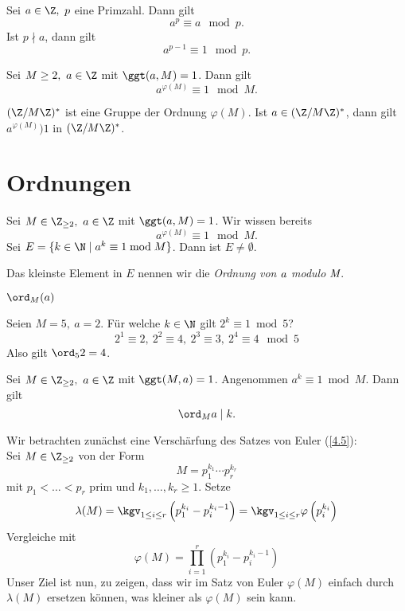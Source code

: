 \begin{thm}\autolabel
	Sei $a \in \Z,\ p $ eine Primzahl. Dann gilt
	\[ a^p \equiv a \mod p. \]
	Ist $p \nmid a$, dann gilt
	\[ a^{p-1} \equiv 1 \mod p. \]
\end{thm}

\begin{thm}[Euler]\autolabel
	Sei $M \geq 2,\ a \in \Z$ mit $\ggt(a,M) = 1$. Dann gilt
	\[ a^{\varphi(M)} \equiv 1 \mod M. \]
\end{thm}

\begin{rem*}
	$(\Z/M\Z)^*$ ist eine Gruppe der Ordnung $\varphi(M)$. Ist $a \in (\Z/M\Z)^*$, dann gilt $a^{\varphi(M)} ) 1$ in $(\Z/M\Z)^*$.
\end{rem*}

\section{Ordnungen}

Sei $M \in \Z_{\geq 2},\ a \in \Z$ mit $\ggt(a,M)=1$. Wir wissen bereits 
\[ a^{\varphi(M)} \equiv 1 \mod M. \]
Sei $E = \{k \in \N \mid a^k \equiv 1 \bmod M\}$. Dann ist $E \neq \emptyset$.

\begin{defn*}[Ordnung]
	Das kleinste Element in $E$ nennen wir die \emph{Ordnung von $\emph{a}$ modulo $\emph{M}$}.
	\begin{notat*}
		$\ord_M(a)$
	\end{notat*}
\end{defn*}

\begin{exmp*}
	Seien $M = 5,\ a= 2$. Für welche $k \in \N$ gilt $2^k \equiv 1 \bmod 5$?
	\[ 2^1 \equiv 2,\ 2^2 \equiv 4,\ 2^3 \equiv 3,\ 2^4 \equiv 4 \mod 5 \]
	Also gilt $\ord_5 2 = 4$.
\end{exmp*}

\begin{lem}\autolabel
	Sei $M \in \Z_{\geq 2},\ a \in \Z$ mit $\ggt(M,a)=1$. Angenommen $a^k \equiv 1 \bmod M$. Dann gilt
	\[ \ord_M a \mid k. \]
\end{lem}

\video Wir betrachten zunächst eine Verschärfung des Satzes von Euler (\ref{4.5}):\\
Sei $M \in \Z_{\geq 2}$ von der Form
\[ M = p_1^{k_1} \dotsm p_r^{k_r} \]
mit $p_1 < \dots < p_r$ prim und $k_1, \dotsc, k_r \geq 1$. Setze
\[ \lambda(M) = \kgv_{1 \leq i \leq r} \left( p_1^{k_i} - p_i^{k_i - 1} \right) = \kgv_{1 \leq i \leq r} \varphi\left(p_i^{k_i}\right) \]
Vergleiche mit
\[ \varphi(M) = \prod_{i=1}^r \left( p_1^{k_i} - p_i^{k_i - 1} \right) \]
Unser Ziel ist nun, zu zeigen, dass wir im Satz von Euler $\varphi(M)$ einfach durch $\lambda(M)$ ersetzen können, was kleiner als $\varphi(M)$ sein kann.

